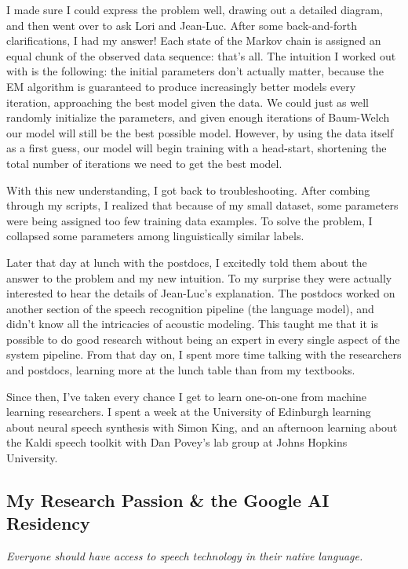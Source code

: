 \documentclass[12pt,a4paper]{article}
\begin{document}
I made sure I could express the problem well, drawing out a detailed diagram, and then went over to ask Lori and Jean-Luc. After some back-and-forth clarifications, I had my answer! Each state of the Markov chain is assigned an equal chunk of the observed data sequence: that's all. The intuition I worked out with is the following: the initial parameters don't actually matter, because the EM algorithm is guaranteed to produce increasingly better models every iteration, approaching the best model given the data. We could just as well randomly initialize the parameters, and given enough iterations of Baum-Welch our model will still be the best possible model. However, by using the data itself as a first guess, our model will begin training with a head-start, shortening the total number of iterations we need to get the best model. 

With this new understanding, I got back to troubleshooting. After combing through my scripts, I realized that because of my small dataset, some parameters were being assigned too few training data examples. To solve the problem, I collapsed some parameters among linguistically similar labels.

Later that day at lunch with the postdocs, I excitedly told them about the answer to the problem and my new intuition. To my surprise they were actually interested to hear the details of Jean-Luc's explanation. The postdocs worked on another section of the speech recognition pipeline (the language model), and didn't know all the intricacies of acoustic modeling. This taught me that it is possible to do good research without being an expert in every single aspect of the system pipeline. From that day on, I spent more time talking with the researchers and postdocs, learning more at the lunch table than from my textbooks.

Since then, I've taken every chance I get to learn one-on-one from machine learning researchers. I spent a week at the University of Edinburgh learning about neural speech synthesis with Simon King, and an afternoon learning about the Kaldi speech toolkit with Dan Povey's lab group at Johns Hopkins University.


\subsection*{My Research Passion \& the Google AI Residency}

\begin{center}
\textit{Everyone should have access to speech technology in their native language.}
\end{center}
\end{document}
